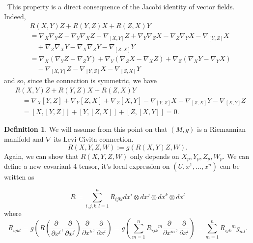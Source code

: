 \documentclass[12pt,a4paper]{book}
\newenvironment{prooff}{{\noindent\it\textcolor{cyan!40!black}{Proof}:}\,}{\par}
\theoremstyle{definition}
\newtheorem{defn}{Definition}[section]
\begin{document}
\begin{prooff}
    This property is a direct consequence of the Jacobi identity of vector fields. Indeed,
    $$
        \begin{aligned}
             & R(X, Y) Z+R(Y, Z) X+R(Z, X) Y                                                                                                     \\
             & =\nabla_X \nabla_Y Z-\nabla_Y \nabla_X Z-\nabla_{[X, Y]} Z+\nabla_Y \nabla_Z X-\nabla_Z \nabla_Y X-\nabla_{[Y, Z]} X              \\
             & \quad+\nabla_Z \nabla_X Y-\nabla_X \nabla_Z Y-\nabla_{[Z, X]} Y                                                                   \\
             & =\nabla_X\left(\nabla_Y Z-\nabla_Z Y\right)+\nabla_Y\left(\nabla_Z X-\nabla_X Z\right)+\nabla_Z\left(\nabla_X Y-\nabla_Y X\right) \\
             & \quad-\nabla_{[X, Y]} Z-\nabla_{[Y, Z]} X-\nabla_{[Z, X]} Y
        \end{aligned}
    $$
    and so, since the connection is symmetric, we have
    $$
        \begin{aligned}
             & R(X, Y) Z+R(Y, Z) X+R(Z, X) Y                                                                            \\
             & \quad=\nabla_X[Y, Z]+\nabla_Y[Z, X]+\nabla_Z[X, Y]-\nabla_{[Y, Z]} X-\nabla_{[Z, X]} Y-\nabla_{[X, Y]} Z \\
             & \quad=[X,[Y, Z]]+[Y,[Z, X]]+[Z,[X, Y]]=0 .
        \end{aligned}
    $$
\end{prooff}
\begin{defn}
    We will assume from this point on that $(M, g)$ is a Riemannian manifold and $\nabla$ its Levi-Civita connection.
    $$
        R(X, Y, Z, W):=g(R(X, Y) Z, W) .
    $$
    Again, we can show that $ R(X, Y, Z, W)$ only depends on $X_p,Y_p,Z_p,W_p$. We can define a new covariant 4-tensor, it's local expression on $(U,x^1,\dots,x^n)$ can be written as

    $$
        R=\sum_{i, j, k, l=1}^n R_{i j k l} d x^i \otimes d x^j \otimes d x^k \otimes d x^l
    $$
    where
    $$
        R_{i j k l}=g\left(R\left(\frac{\partial}{\partial x^i}, \frac{\partial}{\partial x^j}\right) \frac{\partial}{\partial x^k}, \frac{\partial}{\partial x^l}\right)=g\left(\sum_{m=1}^n R_{i j k}{ }^m \frac{\partial}{\partial x^m}, \frac{\partial}{\partial x^l}\right)=\sum_{m=1}^n R_{i j k}{ }^m g_{m l} .
    $$
\end{defn}
\end{document}
